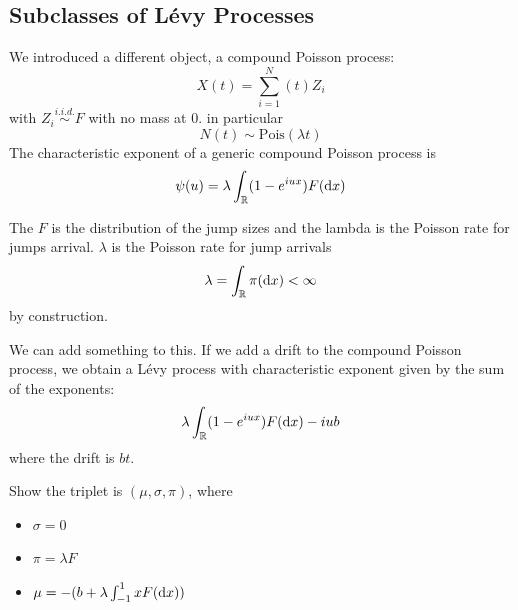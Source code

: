\documentclass[class=article,crop=false]{standalone}
\begin{document}
\subsection{Subclasses of L\'evy Processes}
We introduced a different object, a compound Poisson process:
\begin{equation*}
	X(t) = \sum_{i=1}^N(t) Z_i
\end{equation*}
with $Z_i \stackrel{i.i.d.} \sim F$ with no mass at 0. in particular
$$N(t) \sim \text{Pois}(\lambda t)$$
The characteristic exponent of a generic compound Poisson process is 
\begin{equation*}
	\psi(u) = \lambda \int_{\mathbb{R}} (1-e^{iux})F(\mathop{}\!\mathrm{d} x)
\end{equation*}
\begin{remark}
	The $F$ is the distribution of the jump sizes and the lambda is the Poisson rate for jumps arrival. 
	$\lambda$ is the Poisson rate for jump arrivals
	\begin{equation*}
		\lambda = \int_{\mathbb{R}} \pi(\mathop{}\!\mathrm{d} x) < \infty
	\end{equation*}
	by construction. 
\end{remark}
We can add something to this.
If we add a drift to the compound Poisson process, we obtain a L\'evy process with characteristic exponent given by the sum of the exponents:
\begin{equation*}
	\lambda \int_{\mathbb{R}} (1-e^{iux}) F(\mathop{}\!\mathrm{d} x) - iub
\end{equation*}
where the drift is $bt$. \\
\begin{exercise}
	Show the triplet is $(\mu, \sigma, \pi)$, where
	\begin{itemize}
		\item $\sigma = 0$
		\item $\pi = \lambda F$
		\item $\mu = - (b+\lambda \int_{-1}^1 x F(\mathop{}\!\mathrm{d} x))$
	\end{itemize}
\end{exercise}
\end{document}
